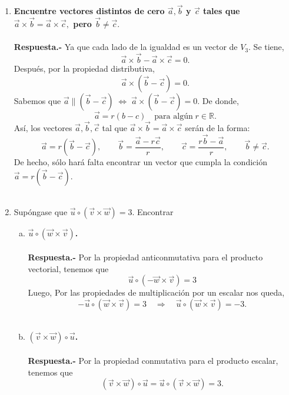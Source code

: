 \begin{enumerate}
\item \textbf{\boldmath Encuentre vectores distintos de cero $\vec{a},\vec{b}$ y $\vec{c}$ tales que $\vec{a}\times \vec{b} = \vec{a}\times \vec{c},$ pero $\vec{b}\neq \vec{c}.$\\\\
    Respuesta.-}\; Ya que cada lado de la igualdad es un vector de $V_3$. Se tiene,
    $$\vec{a}\times  \vec{b} - \vec{a}\times \vec{c}=0.$$
    Después, por la propiedad distributiva,
    $$\vec{a}\times (\vec{b}-\vec{c})=0.$$
    Sabemos que $\vec{a}\parallel (\vec{b}-\vec{c}) \; \Leftrightarrow \; \vec{a}\times (\vec{b}-\vec{c})=0.$ De donde, 
    $$\vec{a}=r(b-c)\quad \mbox{para algún} \; r\in \mathbb{R}.$$
    Así, los vectores $\vec{a},\vec{b},\vec{c}$ tal que $\vec{a}\times \vec{b}=\vec{a}\times \vec{c}$ serán de la forma:  
    $$\vec{a}=r(\vec{b}-\vec{c}),\qquad \vec{b}=\dfrac{\vec{a}-r\vec{c}}{r},\qquad \vec{c}=\dfrac{r\vec{b}-\vec{a}}{r}, \qquad \vec{b}\neq \vec{c}.$$
    De hecho, sólo hará falta encontrar un vector que cumpla la condición $\vec{a}=r(\vec{b}-\vec{c}).$\\\\

\item Supóngase que $\vec{u}\circ\left(\vec{v}\times \vec{w}\right)=3$. Encontrar

    \begin{enumerate}[a)]
	\item \textbf{\boldmath $\vec{u}\circ (\vec{w}\times \vec{v})$.\\\\
	    Respuesta.-}\; Por la propiedad anticonmutativa para el producto vectorial, tenemos que
	    $$\vec{u}\circ\left(-\vec{w}\times \vec{v}\right)=3$$
	    Luego, Por las propiedades de multiplicación por un escalar nos queda,
	    $$-\vec{u}\circ\left(\vec{w}\times \vec{v}\right)=3\quad \Rightarrow\quad \vec{u}\circ\left(\vec{w}\times \vec{v}\right)=-3.$$\\

	\item \textbf{\boldmath $(\vec{v}\times \vec{w})\circ \vec{u}$.\\\\
	    Respuesta.-}\; Por la propiedad conmutativa para el producto escalar, tenemos que
	    $$(\vec{v}\times \vec{w})\circ \vec{u} = \vec{u}\circ (\vec{v}\times \vec{w}) =3.$$\\


\end{enumerate}
\end{enumerate}
